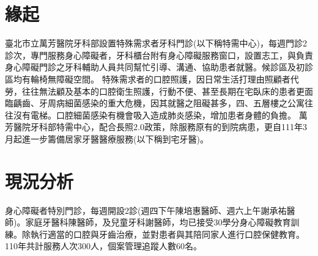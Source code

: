 



\section{緣起}
臺北市立萬芳醫院牙科部設置特殊需求者牙科門診(以下稱特需中心)，每週門診2診次，專門服務身心障礙者，牙科櫃台附有身心障礙服務窗口，設置志工，與負責身心障礙門診之牙科輔助人員共同幫忙引導、溝通、協助患者就醫。候診區及初診區均有輪椅無障礙空間。
特殊需求者的口腔照護，因日常生活打理由照顧者代勞，往往無法顧及基本的口腔衛生照護，行動不便、甚至長期在宅臥床的患者更面臨齲齒、牙周病細菌感染的重大危機，因其就醫之阻礙甚多，四、五層樓之公寓往往沒有電梯。口腔細菌感染有機會吸入造成肺炎感染，增加患者身體的負擔。
萬芳醫院牙科部特需中心，配合長照2.0政策，除服務原有的到院病患，更自111年3月起進一步籌備居家牙醫醫療服務(以下稱到宅牙醫)。

\section{現況分析}
身心障礙者特別門診，每週開設2診(週四下午陳培惠醫師、週六上午謝承祐醫師)。家庭牙醫科陳醫師，及兒童牙科謝醫師，均已接受30學分身心障礙教育訓練。除執行適當的口腔與牙齒治療，並對患者與其陪同家人進行口腔保健教育。110年共計服務人次300人，個案管理追蹤人數60名。
	
